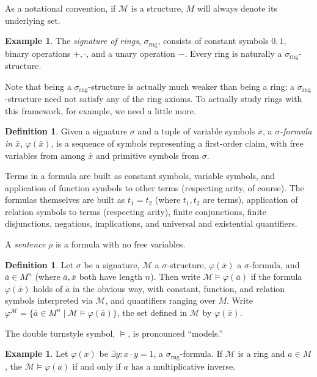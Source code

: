 \documentclass{article}
\theoremstyle{plain}
\theoremstyle{definition}
\newtheorem{defn}[thm]{Definition}
\newtheorem{example}[thm]{Example}
\newcommand{\defterm}{\emph}
\newcommand{\ringsig}{\sigma_{\operatorname{rng}}}
\newcommand{\tuple}{\bar}
\renewcommand{\phi}{\varphi}
\begin{document}
As a notational convention, if $\mathcal{M}$ is a structure, $M$ will
always denote its underlying set.

\begin{example}
  The \defterm{signature of rings}, $\ringsig$, consists of constant
  symbols $0, 1$, binary operations $+, \cdot$, and a unary operation
  $-$. Every ring is naturally a $\ringsig$-structure.
\end{example}

Note that being a $\ringsig$-structure is actually much weaker than
being a ring: a $\ringsig$-structure need not satisfy any of the ring
axioms. To actually study rings with this framework, for example, we
need a little more.

\begin{defn}
  Given a signature $\sigma$ and a tuple of variable symbols
  $\tuple{x}$, a \defterm{$\sigma$-formula in $\tuple{x}$},
  $\phi(\tuple{x})$, is a sequence of symbols representing a
  first-order claim, with free variables from among $\tuple{x}$ and
  primitive symbols from $\sigma$.

  Terms in a formula are built as constant symbols, variable symbols,
  and application of function symbols to other terms (respecting
  arity, of course). The formulas themselves are built as $t_1 = t_2$
  (where $t_1, t_2$ are terms), application of relation symbols to
  terms (respecting arity), finite conjunctions, finite disjunctions,
  negations, implications, and universal and existential quantifiers.

  A \defterm{sentence} $\rho$ is a formula with no free variables.
\end{defn}

\begin{defn}
  Let $\sigma$ be a signature, $\mathcal{M}$ a $\sigma$-structure,
  $\phi(\tuple{x})$ a $\sigma$-formula, and $\tuple{a} \in M^n$ (where
  $\tuple{a}, \tuple{x}$ both have length $n$). Then write
  $\mathcal{M} \models \phi(\tuple{a})$ if the formula
  $\phi(\tuple{x})$ holds of $\tuple{a}$ in the obvious way, with
  constant, function, and relation symbols interpreted via
  $\mathcal{M}$, and quantifiers ranging over $M$. Write
  $\phi^\mathcal{M} = \{ \tuple{a} \in M^n \mid \mathcal{M} \models
  \phi(\tuple{a})\}$, the set defined in $\mathcal{M}$ by
  $\phi(\tuple{x})$.

  The double turnstyle symbol, $\models$, is pronounced ``models.''
\end{defn}

\begin{example}
  Let $\phi(x)$ be $\exists y: x \cdot y = 1$, a
  $\ringsig$-formula. If $\mathcal{M}$ is a ring and $a \in M$, the
  $\mathcal{M} \models \phi(a)$ if and only if $a$ has a
  multiplicative inverse.
\end{example}
\end{document}
